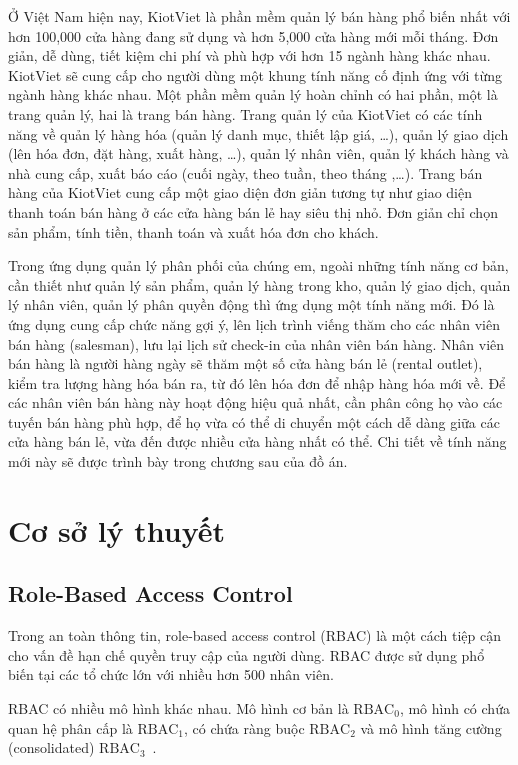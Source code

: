 Ở Việt Nam hiện nay, KiotViet là phần mềm quản lý bán hàng phổ biến
nhất với hơn 100,000 cửa hàng đang sử dụng và hơn 5,000 cửa hàng mới
mỗi tháng. Đơn giản, dễ dùng, tiết kiệm chi phí và phù hợp với hơn
15 ngành hàng khác nhau. KiotViet sẽ cung cấp cho người dùng một khung
tính năng cố định ứng với từng ngành hàng khác nhau. Một phần mềm
quản lý hoàn chỉnh có hai phần, một là trang quản lý, hai là trang
bán hàng. Trang quản lý của KiotViet có các tính năng về quản lý hàng
hóa (quản lý danh mục, thiết lập giá, …), quản lý giao dịch (lên hóa đơn,
đặt hàng, xuất hàng, …), quản lý nhân viên, quản lý khách hàng và
nhà cung cấp, xuất báo cáo (cuối ngày, theo tuần, theo tháng ,…).
Trang bán hàng của KiotViet cung cấp một giao diện đơn giản tương tự
như giao diện thanh toán bán hàng ở các cửa hàng bán lẻ hay
siêu thị nhỏ. Đơn giản chỉ chọn sản phẩm, tính tiền, thanh toán
và xuất hóa đơn cho khách.

Trong ứng dụng quản lý phân phối của chúng em, ngoài những tính
năng cơ bản, cần thiết như quản lý sản phẩm, quản lý hàng trong kho,
quản lý giao dịch, quản lý nhân viên, quản lý phân quyền động thì ứng
dụng một tính năng mới. Đó là ứng dụng cung cấp chức năng gợi ý,
lên lịch trình viếng thăm cho các nhân viên bán hàng (salesman), lưu
lại lịch sử check-in của nhân viên bán hàng. Nhân viên bán hàng
là người hàng ngày sẽ thăm một số cửa hàng bán lẻ (rental outlet),
kiểm tra lượng hàng hóa bán ra, từ đó lên hóa đơn để nhập hàng hóa
mới về. Để các nhân viên bán hàng này hoạt động hiệu quả nhất, cần
phân công họ vào các tuyến bán hàng phù hợp, để họ vừa có thể di chuyển
một cách dễ dàng giữa các cửa hàng bán lẻ, vừa đến được nhiều cửa
hàng nhất có thể. Chi tiết về tính năng mới này sẽ được trình bày
trong chương sau của đồ án.

\section{Cơ sở lý thuyết}
\subsection{Role-Based Access Control}
Trong an toàn thông tin, role-based access control (RBAC) là
một cách tiệp cận cho vấn đề hạn chế quyền truy cập của
người dùng. RBAC được sử dụng phổ biến tại các tổ chức
lớn với nhiều hơn 500 nhân viên. 

RBAC có nhiều mô hình khác nhau. Mô hình cơ bản là
$\text{RBAC}_0$, mô hình có chứa quan hệ phân cấp là
$\text{RBAC}_1$, có chứa ràng buộc $\text{RBAC}_2$ và mô hình tăng
cường (consolidated) $\text{RBAC}_3$~\cite{rbac}.

